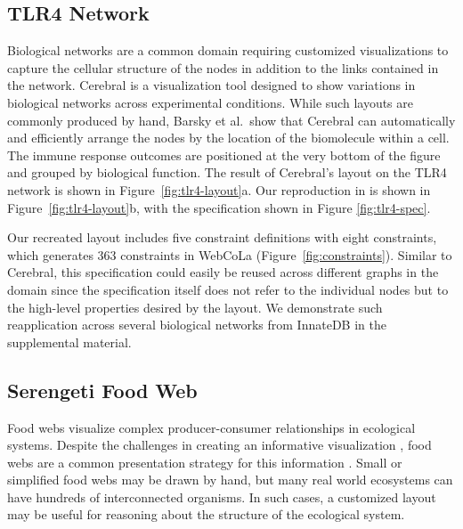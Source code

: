 \subsection{TLR4 Network}
\tlrfourSpec
Biological networks are a common domain requiring customized visualizations
to capture the cellular structure of the nodes in addition to the links
contained in the network. Cerebral \cite{barsky2008cerebral} is a visualization
tool designed to show variations in biological networks across experimental
conditions. While such layouts are commonly produced by hand, Barsky et al.\ show that 
Cerebral can automatically and efficiently arrange the nodes by the location
of the biomolecule within a cell. The immune response outcomes are positioned
at the very bottom of the figure and grouped by biological function. The result
of Cerebral's layout on the TLR4 network is shown in Figure~\ref{fig:tlr4-layout}a.
Our reproduction in \projectname is shown in Figure~\ref{fig:tlr4-layout}b,
with the specification shown in Figure \ref{fig:tlr4-spec}.

Our recreated layout includes five constraint definitions with eight \projectname
constraints, which generates $363$ constraints in WebCoLa (Figure~\ref{fig:constraints}).
Similar to Cerebral, this \projectname specification could easily be reused 
across different graphs in the domain since the specification itself does
not refer to the individual nodes but to the high-level properties desired
by the layout. We demonstrate such reapplication across several 
biological networks from InnateDB \cite{breuer2012innatedb} in the supplemental material.

\subsection{Serengeti Food Web}
\krugerLayout
\serengetiHybrid

Food webs visualize complex producer-consumer relationships in ecological
systems. Despite the challenges in creating an informative
visualization \cite{kearney2016blog}, food webs are a common presentation strategy for this information
\cite{hinke2004visualizing,harper2006dynamic,lavigne1996cod,baskerville2011spatial,yodzis1998local,cohen2003ecological,benson2016higher,kruger2017,kearney2013amplification,kearney2012coupling}.
Small or simplified food webs may be
drawn by hand, but many real world ecosystems can have hundreds of
interconnected organisms. In such cases, a customized layout may be useful
for reasoning about the structure of the ecological system.

